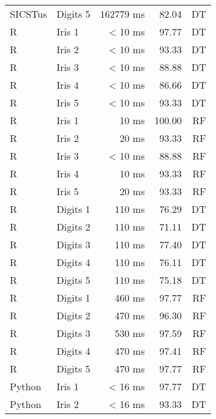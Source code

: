 \begin{longtable}{llrrr}
  SICSTus & Digits 5               & 162779 ms              &  82.04  & DT  \\
  \addlinespace
  R & Iris 1               & < 10 ms               &  97.77 & DT   \\
  R & Iris 2               & < 10 ms               &  93.33 & DT   \\
  R & Iris 3               & < 10 ms               &  88.88  & DT  \\
  R & Iris 4               & < 10 ms               &  86.66 & DT   \\
  R & Iris 5               & < 10 ms               &  93.33 & DT   \\
  \addlinespace
  R & Iris 1               & 10 ms               &  100.00 & RF   \\
  R & Iris 2               & 20 ms               &  93.33  & RF  \\
  R & Iris 3               & < 10 ms               &  88.88  & RF  \\
  R & Iris 4               & 10 ms               &  93.33  & RF  \\
  R & Iris 5               & 20 ms               &  93.33  & RF  \\
  \addlinespace
  R & Digits 1               & 110 ms               &  76.29 & DT   \\
  R & Digits 2               & 110 ms               &  71.11 & DT   \\
  R & Digits 3               & 110 ms               &  77.40  & DT  \\
  R & Digits 4               & 110 ms               &  76.11  & DT  \\
  R & Digits 5               & 110 ms               &  75.18  & DT  \\
  \addlinespace
  R & Digits 1               & 460 ms               &  97.77 & RF   \\
  R & Digits 2               & 470 ms               &  96.30 & RF   \\
  R & Digits 3               & 530 ms               &  97.59  & RF  \\
  R & Digits 4               & 470 ms               &  97.41  & RF  \\
  R & Digits 5               & 470 ms               &  97.77  & RF  \\
  \addlinespace
  Python & Iris 1               & < 16 ms               &  97.77  & DT  \\
  Python & Iris 2               & < 16 ms               &  93.33  & DT  \\

\end{longtable}
